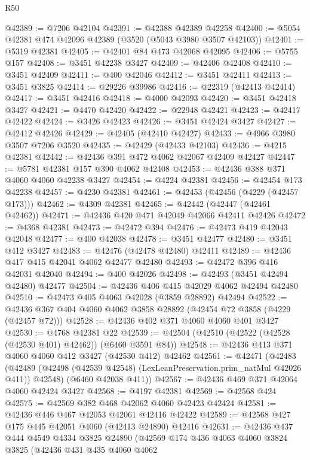 \begin{lexlean}{R50}
\begin{coremodule}
@42389 := @7206 @42104
@42391 := @42388 @42389 @42258
@42400 := @5054 @42381 @474 @42096 @42389 (@3520 (@5043 @3980 @3507 @42103))
@42401 := @5319 @42381
@42405 := @42401 @84 @473 @42068 @42095
@42406 := @5755 @157
@42408 := @3451 @42238 @3427
@42409 := @42406 @42408
@42410 := @3451 @42409
@42411 := @400 @42046
@42412 := @3451 @42411
@42413 := @3451 @3825
@42414 := @29226 @39986
@42416 := @22319 (@42413 @42414)
@42417 := @3451 @42416
@42418 := @4000 @42093
@42420 := @3451 @42418 @3427
@42421 := @4470 @42420
@42422 := @22948 @42421
@42423 := @42417 @42422
@42424 := @3426 @42423
@42426 := @3451 @42424 @3427
@42427 := @42412 @42426
@42429 := @42405 (@42410 @42427)
@42433 := @4966 @3980 @3507 @7206 @3520
@42435 := @42429 (@42433 @42103)
@42436 := @4215 @42381
@42442 := @42436 @391 @472 @4062 @42067 @42409 @42427
@42447 := @5781 @42381 @157 @390 @4062 @42408
@42453 := @42436 @388 @371 @4060 @4060 @42238 @3427
@42454 := @4224 @42381
@42456 := @42454 @173 @42238
@42457 := @4230 @42381
@42461 := @42453 (@42456 (@4229 (@42457 @173)))
@42462 := @4309 @42381
@42465 := @42442 (@42447 (@42461 @42462))
@42471 := @42436 @420 @471 @42049 @42066 @42411 @42426
@42472 := @4368 @42381
@42473 := @42472 @394
@42476 := @42473 @419 @42043 @42048
@42477 := @400 @42038
@42478 := @3451 @42477
@42480 := @3451 @412 @3427
@42483 := @42476 (@42478 @42480) @42411
@42489 := @42436 @417 @415 @42041 @4062 @42477 @42480
@42493 := @42472 @396 @416 @42031 @42040
@42494 := @400 @42026
@42498 := @42493 (@3451 @42494 @42480) @42477
@42504 := @42436 @406 @415 @42029 @4062 @42494 @42480
@42510 := @42473 @405 @4063 @42028 (@3859 @28892) @42494
@42522 := @42436 @367 @404 @4060 @4062 @3858 @28892 (@42454 @72 @3858 (@4229 (@42457 @72)))
@42528 := @42436 @402 @371 @4060 @4060 @401 @3427
@42530 := @4768 @42381 @22
@42539 := @42504 (@42510 (@42522 (@42528 (@42530 @401) @42462)) (@6460 @3591 @84))
@42548 := @42436 @413 @371 @4060 @4060 @412 @3427 (@42530 @412) @42462
@42561 := @42471
    (@42483
      (@42489 (@42498 (@42539 @42548) (LexLeanPreservation.prim_natMul @42026 @411)) @42548)
      (@6460 @42038 @411))
@42567 := @42436 @469 @371 @42064 @4060 @42424 @3427
@42568 := @4197 @42381
@42569 := @42568 @424
@42575 := @42569 @382 @468 @42062 @4060 @42423 @42424
@42581 := @42436 @446 @467 @42053 @42061 @42416 @42422
@42589 := @42568 @427 @175 @445 @42051 @4060 (@42413 @24890) @42416
@42631 := @42436
    @437
    @444
    @4549
    @4334
    @3825
    @24890
    (@42569
      @174
      @436
      @4063
      @4060
      @3824
      @3825
      (@42436
        @431
        @435
        @4060
        @4062

\end{coremodule}
\end{lexlean}
